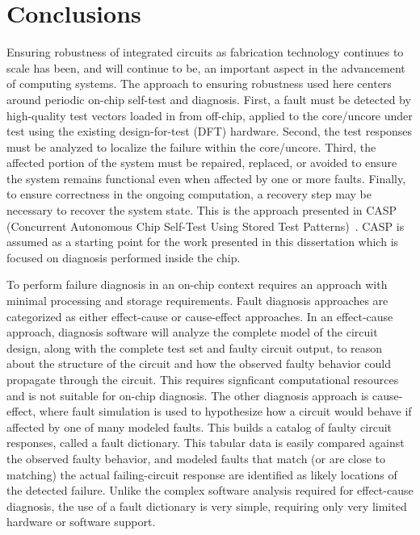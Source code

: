 \chapter{Conclusions}
\label{chap:conclusions}

Ensuring robustness of integrated circuits as fabrication technology continues to scale has been, and will continue to be, an important aspect in the advancement of computing systems.
%
The approach to ensuring robustness used here centers around periodic on-chip self-test and diagnosis.
%
First, a fault must be detected by high-quality test vectors loaded in from off-chip, applied to the core/uncore under test using the existing design-for-test (DFT) hardware.
%
Second, the test responses must be analyzed to localize the failure within the core/uncore.
%
Third, the affected portion of the system must be repaired, replaced, or avoided to ensure the system remains functional even when affected by one or more faults.
%
Finally, to ensure correctness in the ongoing computation, a recovery step may be necessary to recover the system state.
%
This is the approach presented in CASP (Concurrent Autonomous Chip Self-Test Using Stored Test Patterns)~\cite{li08, inoue08, li10casp, li13}.
%
CASP is assumed as a starting point for the work presented in this dissertation which is focused on diagnosis performed inside the chip.

To perform failure diagnosis in an on-chip context requires an approach with minimal processing and storage requirements.
%
Fault diagnosis approaches are categorized as either effect-cause or cause-effect approaches.
%
In an effect-cause approach, diagnosis software will analyze the complete model of the circuit design, along with the complete test set and faulty circuit output, to reason about the structure of the circuit and how the observed faulty behavior could propagate through the circuit.
%
This requires signficant computational resources and is not suitable for on-chip diagnosis.
%
The other diagnosis approach is cause-effect, where fault simulation is used to hypothesize how a circuit would behave if affected by one of many modeled faults.
%
This builds a catalog of faulty circuit responses, called a fault dictionary.
%
This tabular data is easily compared against the observed faulty behavior, and modeled faults that match (or are close to matching) the actual failing-circuit response are identified as likely locations of the detected failure.
%
Unlike the complex software analysis required for effect-cause diagnosis, the use of a fault dictionary is very simple, requiring only very limited hardware or software support.

